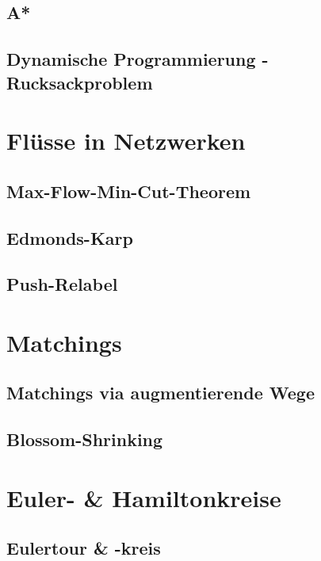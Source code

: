 \documentclass[10pt,a4paper,landscape]{article}
\begin{document}
\begin{multicols*}{2}
            \subsection{ A* }

            \subsection{ Dynamische Programmierung - Rucksackproblem }

        \section{ Flüsse in Netzwerken }
            \subsection{ Max-Flow-Min-Cut-Theorem }\subsection{  }

            \subsection{ Edmonds-Karp }

            \subsection{ Push-Relabel }


        \section{ Matchings }
            \subsection{ Matchings via augmentierende Wege }

            \subsection{ Blossom-Shrinking }


        \section{ Euler- \& Hamiltonkreise }
            \subsection{ Eulertour \& -kreis}


\end{multicols*}
\end{document}
